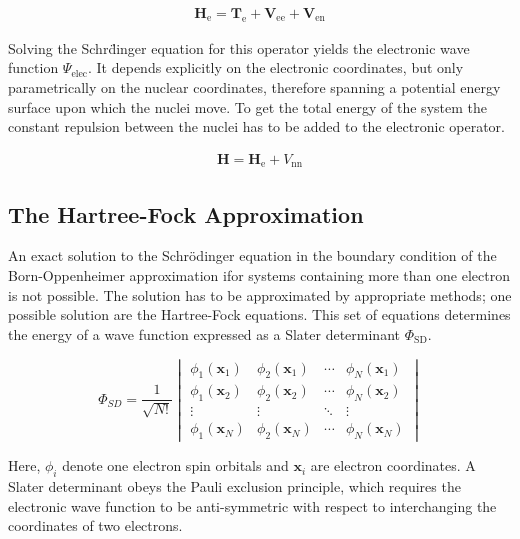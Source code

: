 \begin{align}
    \mathbf{H}_\text{e}=\mathbf{T}_\text{e} + \mathbf{V}_\text{ee} + \mathbf{V}_\text{en}
\end{align}

Solving the Schr\"dinger equation for this operator yields the electronic wave
function $\Psi_\text{elec}$. It depends explicitly on the electronic
coordinates, but only parametrically on the nuclear coordinates, therefore
spanning a potential energy surface upon which the nuclei move. To get the
total energy of the system the constant repulsion between the nuclei has to be
added to the electronic operator.

\begin{align}
    \mathbf{H}=\mathbf{H}_\text{e}+V_\text{nn}
\end{align}

\subsection{The Hartree-Fock Approximation}

An exact solution to the Schr\"odinger equation in the boundary condition of
the Born-Oppenheimer approximation ifor systems containing more than one
electron is not possible. The solution has to be approximated by appropriate
methods; one possible solution are the Hartree-Fock equations. This set of
equations determines the energy of a wave function expressed as a Slater
determinant $\Phi_\text{SD}$.

\begin{equation}
     \Phi_{SD}=\frac{1}{\sqrt{N!}}
     \begin{vmatrix}
         \phi_1(\mathbf{x}_1) & \phi_2(\mathbf{x}_1) & \cdots & \phi_N(\mathbf{x}_1)\\
         \phi_1(\mathbf{x}_2) & \phi_2 (\mathbf{x}_2) & \cdots & \phi_N(\mathbf{x}_2)\\
         \vdots & \vdots & \ddots & \vdots\\
         \phi_1(\mathbf{x}_N) & \phi_2(\mathbf{x}_N) & \cdots & \phi_N(\mathbf{x}_N)
     \end{vmatrix}
     \label{eqn:SlaterDet}
\end{equation}

Here, $\phi_i$ denote one electron spin orbitals and $\mathbf{x}_i$ are
electron coordinates. A Slater determinant obeys the Pauli exclusion principle,
which requires the electronic wave function to be anti-symmetric with respect
to interchanging the coordinates of two electrons.

